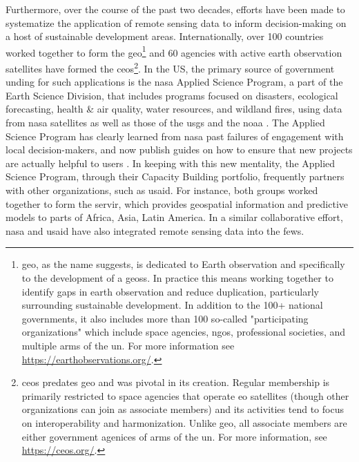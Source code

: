 \documentclass[notitlepage]{article}
\begin{document}
Furthermore, over the course of the past two decades, efforts have been made to systematize the application of remote sensing data to inform decision-making on a host of sustainable development areas. Internationally, over 100 countries worked together to form the \ac{geo}\footnote{\ac{geo}, as the name suggests, is dedicated to Earth observation and specifically to the development of a \ac{geoss}. In practice this means working together to identify gaps in earth observation and reduce duplication, particularly surrounding sustainable development. In addition to the 100+ national governments, it also includes more than 100 so-called "participating organizations" which include space agencies, \acp{ngo}, professional societies, and multiple arms of the \ac{un}. For more information see \url{https://earthobservations.org/}.} and 60 agencies with active earth observation satellites have formed the \ac{ceos}\footnote{\ac{ceos} predates \ac{geo} and was pivotal in its creation. Regular membership is primarily restricted to space agencies that operate \ac{eo} satellites (though other organizations can join as associate members) and its activities tend to focus on interoperability and harmonization. Unlike \ac{geo}, all associate members are either government agenices of arms of the \ac{un}. For more information, see \url{https://ceos.org/}.}. In the US, the primary source of government unding for such applications is the \ac{nasa} Applied Science Program, a part of the Earth Science Division, that includes programs focused on disasters, ecological forecasting, health \& air quality, water resources, and wildland fires, using data from \ac{nasa} satellites as well as those of the \ac{usgs} and the \ac{noaa} \cite{nasaappliedsciencesprogramWhatWeNASA}. The Applied Science Program has clearly learned from \ac{nasa} past failures of engagement with local decision-makers, and now publish guides on how to ensure that new projects are actually helpful to users \cite{irwinSERVIRServicePlanning2017}. In keeping with this new mentality, the Applied Science Program, through their Capacity Building portfolio, frequently partners with other organizations, such as \ac{usaid}. For instance, both groups worked together to form the \ac{servir}, which provides geospatial information and predictive models to parts of Africa, Asia, Latin America. In a similar collaborative effort, \ac{nasa} and \ac{usaid} have also integrated remote sensing data into the \ac{fews}. 
\end{document}
